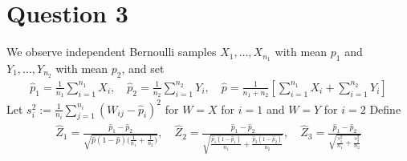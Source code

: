 \documentclass[10pt]{article}
\begin{document}
\newpage

\section{Question 3}

We observe independent Bernoulli samples $X_1, …, X_{n_1}$ with mean $p_1 $ and $Y_1, …, Y_{n_2} $ with mean $p_2 $, and set 
\begin{gather*}
    \hat{p}_1 = \frac{1}{n_1}\sum_{i = 1}^{n_1}X_i, \quad \hat{p}_2 = \frac{1}{n_2}\sum_{i = 1}^{n_2}Y_i, \quad \hat{p} = \frac{1}{n_1 + n_2}\left[\sum_{i = 1}^{n_1}X_i + \sum_{i = 1}^{n_2}Y_i\right]
\end{gather*}
Let $s_i^2 := \frac{1}{n_i}\sum_{j = 1}^{n_i}(W_{ij} - \hat{p}_i)^2 $ for $W = X $ for $i = 1 $ and $W = Y $ for $i = 2 $ Define 
\begin{gather*}
    \hat{Z}_1 = \frac{\hat{p}_1 - \hat{p}_2}{\sqrt{\hat{p}(1 - \hat{p})\Big(\frac{1}{n_1} + \frac{1}{n_2}\Big)}}, \quad \hat{Z}_2 = \frac{\hat{p}_1 - \hat{p}_2}{\sqrt{\frac{\hat{p}_1(1 - \hat{p}_1)}{n_1} + \frac{\hat{p}_2(1 - \hat{p}_2)}{n_2}}}, \quad \hat{Z}_3 = \frac{\hat{p}_1 - \hat{p}_2}{\sqrt{\frac{s_1^2}{n_1} + \frac{s_2^2}{n_2}}}
\end{gather*}
\end{document}
